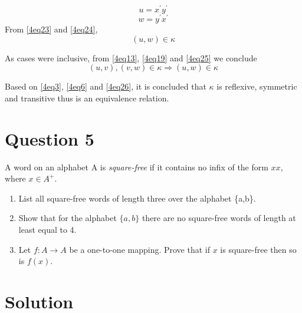 \begin{itemize}
\begin{enumerate}
\begin{equation}\label{4eq23}
u = x^\prime y^\prime
\end{equation}
\begin{equation}\label{4eq24}
w = y^\prime x^\prime
\end{equation}
From \eqref{4eq23} and \eqref{4eq24},
\begin{equation}\label{4eq25}
\left( u, w \right) \in \kappa
\end{equation}
\end{enumerate}
As cases were inclusive, from \eqref{4eq13}, \eqref{4eq19} and \eqref{4eq25} we conclude
\begin{equation}\label{4eq26}
\left(u,v \right),\left(v,w\right) \in \kappa \Rightarrow \left(u,w\right) \in \kappa
\end{equation}
\end{itemize}

Based on \eqref{4eq3}, \eqref{4eq6} and \eqref{4eq26}, it is concluded that $\kappa$ is reflexive, symmetric and transitive thus is an equivalence relation.

\section*{Question 5}

A word on an alphabet A is \textit{square-free} if it contains no infix of the form $xx$, where $x \in A^+$.

\begin{enumerate}[label=(\alph*)]

	\item
	List all square-free words of length three over the alphabet \{a,b\}.

	\item
	Show that for the alphabet $\{a,b\}$ there are no square-free words of length at least equal to 4.

	\item
	Let $f:A \rightarrow A$ be a one-to-one mapping.
	Prove that if $x$ is square-free then so is $f(x)$.

\end{enumerate}

\section*{Solution}

